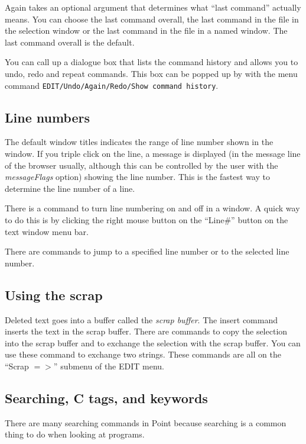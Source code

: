 Again takes an optional argument that determines what
``last command'' actually means.
You can choose the last command overall, the last command
in the file in the selection window or the last command
in the file in a named window.
The last command overall is the default.

You can call up a dialogue box that lists the command
history and allows you to undo, redo and repeat commands.
This box can be popped up by with the menu command
{\tt EDIT/Undo/Again/Redo/Show command history}.




\subsection{Line numbers}

The default window titles indicates the range of line number shown
in the  window.
If you triple click on the line, a message is displayed
(in the message line of the browser usually, although
this can be controlled by the user with the {\it messageFlags} option)
showing the line number.
This is the fastest way to determine the line number of a line.

There is a command to turn line numbering on and off in a window.
A quick way to do this is by clicking the right mouse button on the
``Line\#'' button on the text window menu bar.

There are commands to jump to a specified line number or to
the selected line number.



\subsection{Using the scrap}

Deleted text goes into a buffer called the {\it scrap buffer}.
The insert command inserts the text in the scrap buffer.
There are commands to copy the selection into the scrap buffer
and to exchange the selection with the scrap buffer.
You can use these command to exchange two strings.
These commands are all on the ``Scrap $=>$'' submenu of the EDIT menu.



\subsection{Searching, C tags, and keywords}

There are many searching commands in Point because searching
is a common thing to do when looking at programs.

